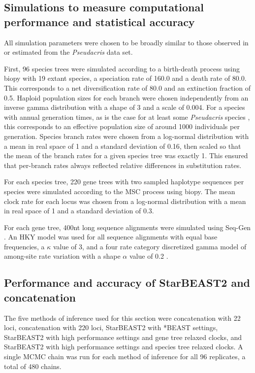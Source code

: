 \documentclass[nogrid]{MBE}%
\begin{document}
\subsection{Simulations to measure computational performance and statistical accuracy}

All simulation parameters were chosen to be broadly similar to those observed in
or estimated from the \textit{Pseudacris} data set.

First, 96 species trees were simulated according to a birth-death process
\citep{Gernhard2008769} using biopy with 19 extant species, a speciation rate of
160.0 and a death rate of 80.0. This corresponds to a net diversification rate
of 80.0 and an extinction fraction of 0.5. Haploid population sizes
for each branch were chosen independently from an inverse gamma distribution
with a shape of 3 and a scale of 0.004. For a species with annual generation
times, as is the case for at least some \textit{Pseudacris} species
\citep{10.2307/1446044}, this corresponds to an effective population size
of around 1000 individuals per generation. Species branch rates were chosen from a
log-normal distribution with a mean in real space of 1 and a standard
deviation of 0.16, then scaled so that the mean of the branch rates for a given
species tree was exactly 1. This ensured that per-branch rates always reflected
relative differences in substitution rates.

For each species tree, 220 gene trees with two sampled haplotype sequences per
species were simulated according to the MSC process using biopy. The mean clock
rate for each locus was chosen from a log-normal distribution with a mean in
real space of 1 and a standard deviation of 0.3.

For each gene tree, 400nt long sequence alignments were simulated using Seq-Gen
\citep{Rambaut01061997}. An HKY model was used for all sequence alignments with
equal base frequencies, a $\kappa$ value of 3, and a four rate category
discretized gamma model of among-site rate variation with a shape $\alpha$ value
of 0.2 \citep{Yang1994}.

\subsection{Performance and accuracy of StarBEAST2 and concatenation}

The five methods of inference used for this section were concatenation with 22
loci, concatenation with 220 loci, StarBEAST2 with *BEAST settings, StarBEAST2
with high performance settings and gene tree relaxed clocks, and StarBEAST2 with
high performance settings and species tree relaxed clocks. A single MCMC chain was
run for each method of inference for all 96 replicates, a total of 480 chains.
\end{document}
